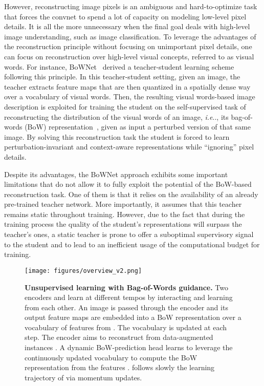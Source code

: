 \documentclass[final]{cvpr}
\makeatletter
\DeclareRobustCommand\onedot{\futurelet\@let@token\@onedot}
\def\@onedot{\ifx\@let@token.\else.\null\fi\xspace}
\def\ie{\emph{i.e}\onedot} \def\Ie{\emph{I.e}\onedot}
\makeatother
\begin{document}
However, reconstructing image pixels is an ambiguous and hard-to-optimize task that forces the convnet to spend a lot of capacity on modeling low-level pixel details. It is all the more unnecessary when the final goal deals with high-level image understanding, such as image classification.
To leverage the advantages of the reconstruction principle without focusing on unimportant pixel details, one can focus on reconstruction over high-level visual concepts, referred to as visual words. 
For instance, BoWNet~\cite{gidaris2020learning} derived a teacher-student learning scheme following this principle. 
In this teacher-student setting, given an image, the teacher extracts feature maps that are then quantized in a spatially dense way over a vocabulary of visual words. Then, the resulting visual words-based image description is exploited for training the student on the self-supervised task of reconstructing the distribution of the visual words of an image, \ie, its bag-of-words (BoW) representation~\cite{yang2007evaluating}, given as input a perturbed version of that same image.
By solving this reconstruction task the student is forced to learn perturbation-invariant and context-aware representations while ``ignoring'' pixel details.

Despite its advantages,
the BoWNet approach exhibits some important limitations that do not allow it 
to fully exploit the potential of the BoW-based reconstruction task.
One of them is that it relies on the availability of an already pre-trained teacher network.
More importantly, it assumes that this teacher remains static throughout training.
However, due to the fact that during the training process the quality of the student's representations will surpass the teacher's ones, a static teacher is prone to offer a suboptimal supervisory signal to the student and to lead to an inefficient usage of the computational budget for training.

\begin{figure*}[t!]
\renewcommand{\captionfont}{\small}
\renewcommand{\captionlabelfont}{\bf}
\centering
\texttt{[image: figures/overview\_v2.png]}
\caption{\textbf{Unsupervised learning with Bag-of-Words guidance.} Two encoders  and  learn at different tempos by interacting and learning from each other. An image  is passed through the encoder  and its output feature maps  are embedded into a BoW representation  over a vocabulary  of features from . The vocabulary  is updated at each step. The encoder  aims to reconstruct  from data-augmented instances . A dynamic BoW-prediction head learns to leverage the continuously updated vocabulary  to compute the BoW representation from the features .  follows slowly the learning trajectory of  via momentum updates. }
\label{fig:pipeline}
\vspace{-12pt}
\end{figure*}
\end{document}
